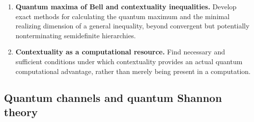 \documentclass{article}
\begin{document}
\begin{enumerate}[label=\textbf{N\arabic*.},leftmargin=*]
\item \precise{} \textbf{Quantum maxima of Bell and contextuality inequalities.}
Develop exact methods for calculating the quantum maximum and the
minimal realizing dimension of a general inequality, beyond
convergent but potentially nonterminating semidefinite hierarchies.

\item \formalism{} \textbf{Contextuality as a computational resource.}
Find necessary and sufficient conditions under which contextuality
provides an actual quantum computational advantage, rather than merely
being present in a computation.

\end{enumerate}


\subsection{Quantum channels and quantum Shannon theory}
\end{document}
